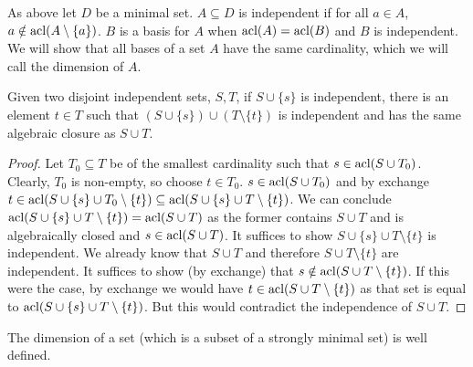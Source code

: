 \begin{definition}\label{definition_independence}
As above let \(D\) be a minimal set. \(A \subseteq D\) is independent if for all \(a \in A\), \(a \notin \text{acl}(A \setminus \{a\})\). 
\(B\) is a basis for \(A\) when \(\text{acl}(A) = \text{acl}(B)\) and \(B\) is independent.
We will show that all bases of a set \(A\)  have the same cardinality, which we will call the dimension of \(A\).
\end{definition}

\begin{lemma}\label{lemma_dimension}
Given two disjoint independent sets, \(S, T\), 
 if \(S \cup \{s\}\) is independent, there is an element \(t \in T\) such that \((S \cup \{s\}) \cup (T \setminus \{t\})\) is independent and has the same algebraic closure as \(S \cup T\). 
\end{lemma}

\begin{proof}
Let \(T_0 \subseteq T\) be of the smallest cardinality such that \(s \in \text{acl}(S \cup T_0)\). 
Clearly, \(T_0\) is non-empty, so choose \(t \in T_0\). 
\(s \in \text{acl}(S \cup T_0)\) and by exchange \(t \in \text{acl}(S \cup \{s\} \cup T_0 \setminus \{t\}) \subseteq \text{acl}(S \cup \{s\} \cup T \setminus \{t\})\).
We can conclude \(\text{acl}(S \cup \{s\} \cup T \setminus \{t\}) = \text{acl}(S \cup T)\) as the former contains \(S \cup T\) and is algebraically closed and \(s \in \text{acl}(S \cup T)\). 
It suffices to show \(S \cup \{s\} \cup T \setminus \{t\}\) is independent. 
We already know that \(S \cup T\) and therefore \(S \cup T \setminus \{t\}\) are independent. 
It suffices to show (by exchange) that \(s \notin \text{acl}(S \cup T \setminus \{t\})\).
If this were the case, by exchange we would have \(t \in \text{acl}(S \cup T \setminus \{t\})\) as that set is equal to \(\text{acl}(S \cup \{s\} \cup T \setminus\{t\})\).
But this would contradict the independence of \(S \cup T\). 
\end{proof}

\begin{theorem}\label{theorem_dimension}
The dimension of a set (which is a subset of a strongly minimal set) is well defined.
\end{theorem}

